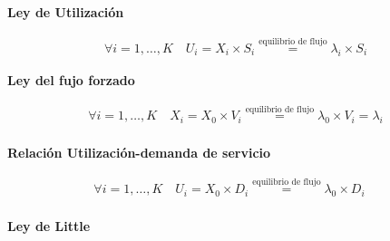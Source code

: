 \documentclass[a4paper,12pt]{article}
\begin{document}
\textbf{Ley de Utilización}

\begin{tcolorbox}[colback=yellow!5!white, colframe=yellow!75!black]
    \begin{align*}
        \forall i = 1, \ldots, K \quad U_i = X_i \times S_i \overset{\text{equilibrio de flujo}}{=} \lambda_i \times S_i
        \end{align*}
    \end{tcolorbox}        

\textbf{Ley del fujo forzado}

\begin{tcolorbox}[colback=yellow!5!white, colframe=yellow!75!black]
    \begin{align*}
        \forall i = 1, \ldots, K \quad X_i = X_0 \times V_i \overset{\text{equilibrio de flujo}}{=} \lambda_0 \times V_i = \lambda_i \\  
    \end{align*}
\end{tcolorbox}

\textbf{Relación Utilización-demanda de servicio}

\begin{tcolorbox}[colback=yellow!5!white, colframe=yellow!75!black]
    \begin{align*}
        \forall i = 1, \ldots, K \quad U_i = X_0 \times D_i \overset{\text{equilibrio de flujo}}{=} \lambda_0 \times D_i \quad  \\
    \end{align*}
\end{tcolorbox}

\textbf{Ley de Little}
\end{document}
